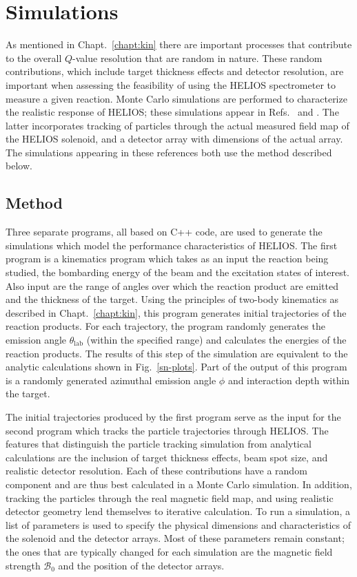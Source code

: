 \chapter{Simulations}
\label{simulation}
As mentioned in Chapt.~\ref{chapt:kin} there are important processes that contribute to the overall $Q$-value resolution that are random in nature.  These random contributions, which include target thickness effects and detector resolution, are important when assessing the feasibility of using the HELIOS spectrometer to measure a given reaction.  Monte Carlo simulations are performed to characterize the realistic response of HELIOS; these simulations %
appear in Refs.~\cite{Wuosmaa_2007} and \cite{Lighthall_2010}.  The latter incorporates tracking of particles through the actual measured field map of the HELIOS solenoid, and a detector array with dimensions of the actual array.  The simulations appearing in these references both use the method described below.  

\section{Method}
Three separate programs, all based on C++ code, are used to generate the simulations which model the performance characteristics of HELIOS.    The first program is a kinematics program which takes as an input the reaction being studied, the bombarding energy of the beam and the excitation states of interest.  Also input are the range of angles over which the reaction product are emitted and the thickness of the target.  Using the principles of two-body kinematics as described in Chapt.~\ref{chapt:kin}, this program generates initial trajectories of the reaction products.  For each trajectory, the program randomly generates the emission angle $\theta_\mathrm{lab}$ (within the specified range) and calculates the energies of the reaction products.  The results of this step of the simulation are equivalent to the analytic calculations  shown in Fig.~\ref{sn-plots}.  Part of the output of this program is a randomly generated azimuthal emission angle $\phi$ and interaction depth within the target.  

The initial trajectories produced by the first program serve as the input for the second program which tracks the particle trajectories through HELIOS.  The features that distinguish the particle tracking simulation from analytical calculations are the inclusion of target thickness effects, beam spot size, and realistic detector resolution.  Each of these contributions have a random component and are thus best calculated in a Monte Carlo simulation.  In addition, tracking the particles through the real magnetic field map, and using realistic detector geometry lend themselves to iterative calculation.  To run a simulation, a list of parameters is used to specify the physical dimensions and characteristics of the solenoid and the detector arrays.  Most of these parameters remain constant; the ones that are typically changed for each simulation are the magnetic field strength $\mathscr{B}_0$ and the position of the detector arrays.  

